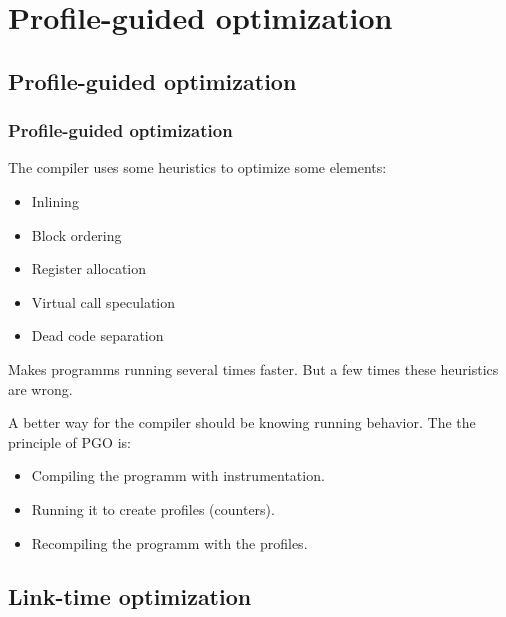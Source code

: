 \documentclass{beamer}
\begin{document}
\section{Profile-guided optimization}

    \begin{frame}
        \tableofcontents[currentsection]
    \end{frame}

    \subsection{Profile-guided optimization}

    \begin{frame}
        \frametitle{Profile-guided optimization}

        The compiler uses some heuristics to optimize some elements:
        \begin{itemize}
            \item Inlining
            \item Block ordering
            \item Register allocation
            \item Virtual call speculation
            \item Dead code separation
        \end{itemize}
        Makes programms running several times faster.
        But a few times these heuristics are wrong.
    \end{frame}


    \begin{frame}
        A better way for the compiler should be knowing running behavior.
        The the principle of PGO is:
        \begin{itemize}
            \item Compiling the programm with instrumentation.
            \item Running it to create profiles (counters).
            \item Recompiling the programm with the profiles.
        \end{itemize}
    \end{frame}
    \subsection{Link-time optimization}
\end{document}
